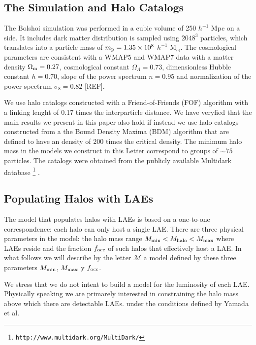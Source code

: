 \documentclass{emulateapj}
\begin{document}
\subsection{The Simulation and Halo Catalogs}

The Bolshoi simulation was performed in a cubic volume of 250 $h^{-1}$ Mpc on a side. It includes dark matter distribution is sampled using $2048^{3}$ particles, which translates into a particle mass of $m_{\rm p}=1.35\times 10^{8}$ $h^{-1}$ M$_{\odot}$.  The cosmological parameters are consistent with a WMAP5 and WMAP7 data with a matter density $\Omega_{\rm m} = 0.27$, cosmological constant $\Omega_{\Lambda}=0.73$, dimensionless Hubble constant $h=0.70$, slope of the power spectrum $n=0.95$ and normalization of the power spectrum $\sigma_{8}=0.82$ [REF].

We use halo catalogs constructed with a Friend-of-Friends (FOF) algorithm with a linking lenght of 0.17 times the interparticle distance. We have veryfied that the main results we present in this paper also hold if instead we use halo catalogs constructed from a the Bound Density Maxima (BDM) algorithm \citep{KlypinBDM} that are defined to have an density of 200 times the critical density. The minimum halo mass in the models we construct in this Letter correspond to groups of $\sim 75$ particles. The catalogs were obtained from the publicly available Multidark database \footnote{{\tt http://www.multidark.org/MultiDark/}} \citep{2011arXiv1109.0003R}. 



\subsection{Populating Halos with LAEs}
\label{subsec:mocks}

The model that populates halos with LAEs is based on a one-to-one correspondence: each halo can only host a single LAE. There are three physical parameters in the model: the halo mass range $M_{\rm min}< M_{\rm halo} < M_{\rm max}$ where LAEs reside and the fraction $f_{\rm occ}$ of such halos that effectively host a LAE. In what follows we will describe by the letter ${\mathcal M}$ a model defined by these three parameters $M_{\rm min}$, $M_{\rm max}$ y $f_{\rm occ}$.

We stress that we do not intent to build a model for the luminosity of each LAE. Physically speaking we are primarely interested in constraining the halo mass above which there are detectable LAEs. under the conditions defined by Yamada et al. 
\end{document}
